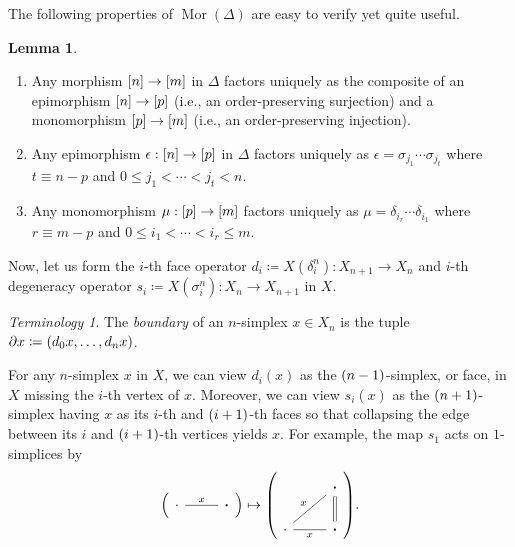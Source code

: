 \documentclass[10pt,letterpaper,cm]{nupset}
\theoremstyle{definition}
\theoremstyle{theorem}
\newtheorem{lemma}[definition]{Lemma}
\theoremstyle{remark}
\newtheorem*{term}{Terminology}
\DeclareMathOperator{\mor}{Mor}
\newcommand{\0}{\mathbf{0}}
\newcommand{\1}{\mathbf{1}}
\newcommand{\2}{\mathbf{2}}
\newcommand{\be}{\begin{enumerate}}
\newcommand{\ee}{\end{enumerate}}
\begin{document}
The following properties of $\mor(\varDelta)$ are easy to verify yet quite useful.

\begin{lemma}\label{mordelt} $ $
\be[label=(\arabic*)]
\item Any morphism $ \mleft[n\mright] \to \mleft[m\mright]$ in $\varDelta$ factors uniquely as the composite of an epimorphism $ \mleft[n\mright] \to \mleft[p\mright]$ (i.e., an order-preserving surjection) and a monomorphism $ \mleft[p\mright] \to \mleft[m\mright]$ (i.e., an order-preserving injection).
\item Any epimorphism $\epsilon : \mleft[n\mright] \to \mleft[p\mright]$ in $\varDelta$ factors uniquely as $\epsilon = \sigma_{j_{1}} \cdots \sigma_{j_{t}}$ where $t \equiv n-p$ and \linebreak $0 \leq j_{1}<\cdots<j_{t}<n$.
\item Any monomorphism $\mu : \mleft[p\mright] \to \mleft[m\mright]$ factors uniquely as $\mu=\delta_{i_{r}} \cdots \delta_{i_{1}}$ where $r \equiv m-p$ and \linebreak $0 \leq i_{1}<\cdots<i_{r} \leq m$.
\ee
\end{lemma}

\smallskip

Now, let us form the $i$-th face operator $d_i \coloneqq X(\delta_i^n) :X_{n+1}\to X_n$ and $i$-th degeneracy operator $s_i \coloneqq X(\sigma_i^n) : X_n \to X_{n+1}$ in $X$.

\begin{term}
The \textit{boundary} of an $n$-simplex $x\in X_n$ is the tuple $\partial{x} \coloneqq \mleft(d_0{x}, \ldots, d_n{x}\mright)$.
\end{term}

For any $n$-simplex $x$ in $X$, we can view $d_i(x)$ as the $\mleft(n-1\mright)$-simplex, or face, in $X$ missing the $i$-th vertex of $x$. Moreover, we can view $s_i(x)$ as the $\mleft(n+1\mright)$-simplex having $x$ as its $i$-th and $\mleft(i+1\mright)$-th faces so that collapsing the edge between its $i$ and $\mleft(i+1\mright)$-th vertices yields $x$. For example, the map $s_1$ acts on $1$-simplices by
\[
\mleft(\begin{tikzcd}
\cdotp \arrow[r, "x", no head] & \boldsymbol{\cdot}
\end{tikzcd}\mright) \mapsto
\mleft( \begin{tikzcd}
                                  & \boldsymbol{\cdot}\arrow[d, equal] \\
\cdotp \arrow[r, no head, "x"'] \arrow[ru, no head, "x"] &\boldsymbol{\cdot}          
\end{tikzcd}\mright).
\]
\end{document}
